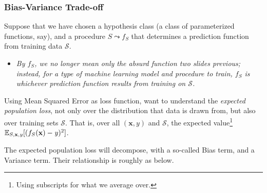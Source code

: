 \documentclass[smaller]{beamer}
\theoremstyle{example}
\newcommand{\x}{\textbf{x}}
\newcommand{\ix}[1]{{\it #1}}
\begin{document}
\begin{frame}
    \frametitle{Bias-Variance Trade-off}
    Suppose that we have chosen a hypothesis class (a class of parameterized functions, say), and a procedure $S \leadsto f_S$ that determines a prediction function from training data $\mathcal S$. 
    \begin{itemize}
        \item \textit{By $f_S$, we no longer mean only the absurd function two slides previous; instead, for a type of machine learning model and procedure to train, $f_S$ is whichever prediction function results from training on $\mathcal S$.}
    \end{itemize}

    \pause
    Using Mean Squared Error as loss function, want to understand the \textit{expected population loss}, not only over the distribution that data is drawn from, but also over training sets $\mathcal S$. That is, over all $(\x, y)$ and $\mathcal S$, the expected value\footnote{Using subscripts for what we average over.} $\mathbb E_{S, \x, \ix y}[(f_S(\x) - \ix y)^2]$.

    \pause
    The expected population loss will decompose, with a so-called Bias term, and a Variance term. Their relationship is roughly as below.
\end{frame}
\end{document}
